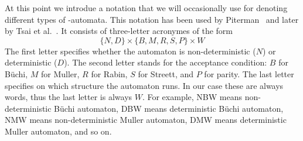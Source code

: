 At this point we introdue a notation that we will occasionally use for denoting different types of \om-automata. This notation has been used by Piterman~\cite{2006_piterman} and later by Tsai et al.~\cite{2011_tsai}. It consists of three-letter acronymes of the form
\[
\{N, D\} \times \{B, M, R, S, P\} \times W
\]
The first letter specifies whether the automaton is non-deterministic ($N$) or deterministic ($D$). The second letter stands for the acceptance condition: $B$ for Büchi, $M$ for Muller, $R$ for Rabin, $S$ for Streett, and $P$ for parity. The last letter specifies on which structure the automaton runs. In our case these are always words, thus the last letter is always $W$. For example, NBW means non-deterministic Büchi automaton, DBW means deterministic Büchi automaton, NMW means non-deterministic Muller automaton, DMW means deterministic Muller automaton, and so on.






